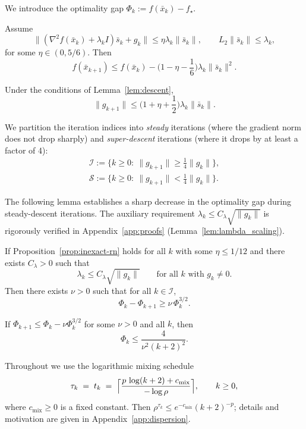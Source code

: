 \documentclass[review,onefignum,onetabnum]{siamart171218}
\begin{document}
	We introduce the optimality gap $\Phi_k:=f(\bar x_k)-f_\star$.
	
	\begin{lemma}\label{lem:descent}
		Assume
		\[
		\|(\nabla^2 f(\bar x_k)+\lambda_k I)\bar s_k+g_k\|\le \eta\lambda_k\|\bar s_k\|,
		\qquad
		L_2\|\bar s_k\|\le \lambda_k,
		\]
		for some $\eta\in(0,5/6)$.
		Then
		\[
		f(\bar x_{k+1})\le f(\bar x_k) - \Big(1-\eta-\frac{1}{6}\Big)\lambda_k\|\bar s_k\|^2.
		\]
	\end{lemma}
	
	\begin{lemma}\label{lem:grad_bound}
		Under the conditions of Lemma~\ref{lem:descent},
		\[
		\|g_{k+1}\|\le \Big(1+\eta+\frac{1}{2}\Big)\lambda_k\|\bar s_k\|.
		\]
	\end{lemma}
	
	We partition the iteration indices into \emph{steady} iterations
	(where the gradient norm does not drop sharply) and
	\emph{super-descent} iterations (where it drops by at least a factor of 4):
	\begin{gather*}
		\mathcal I:=\{k\ge0:\ \|g_{k+1}\|\ge \tfrac14\|g_k\|\},\\
		\mathcal S:=\{k\ge0:\ \|g_{k+1}\|< \tfrac14\|g_k\|\}.
	\end{gather*}
	
	The following lemma establishes a sharp decrease in the optimality gap
	during steady-descent iterations.
	The auxiliary requirement $\lambda_k\le C_\lambda\sqrt{\|g_k\|}$ is
	rigorously verified in Appendix~\ref{app:proofs}
	(Lemma~\ref{lem:lambda_scaling}).
	
	\begin{lemma}\label{lem:steady}
		If Proposition~\ref{prop:inexact-rn} holds for all $k$ with some $\eta\le 1/12$
		and there exists $C_\lambda>0$ such that
		\[
		\lambda_k\le C_\lambda\sqrt{\|g_k\|}\qquad\text{for all $k$ with $g_k\neq 0$}.
		\]
		Then there exists $\nu>0$ such that for all $k\in\mathcal I$,
		\[
		\Phi_k-\Phi_{k+1}\ge \nu\,\Phi_k^{3/2}.
		\]
	\end{lemma}
	
	\begin{lemma}\label{lem:solve32}
		If $\Phi_{k+1}\le \Phi_k-\nu\Phi_k^{3/2}$ for some $\nu>0$ and all $k$, then
		\[
		\Phi_k\le \frac{4}{\nu^2(k+2)^2}.
		\]
	\end{lemma}
	
	Throughout we use the logarithmic mixing schedule
	\begin{equation}\label{eq:log_schedule_main}
		\tau_k \;=\; t_k \;=\;
		\Bigl\lceil \frac{p\,\log(k+2)+c_{\mathrm{mix}}}{-\log\rho} \Bigr\rceil,
		\qquad k\ge 0,
	\end{equation}
	where $c_{\mathrm{mix}}\ge0$ is a fixed constant. Then
	$\rho^{\tau_k}\le e^{-c_{\mathrm{mix}}}(k+2)^{-p}$; details and
	motivation are given in Appendix~\ref{app:dispersion}.
	
\end{document}
